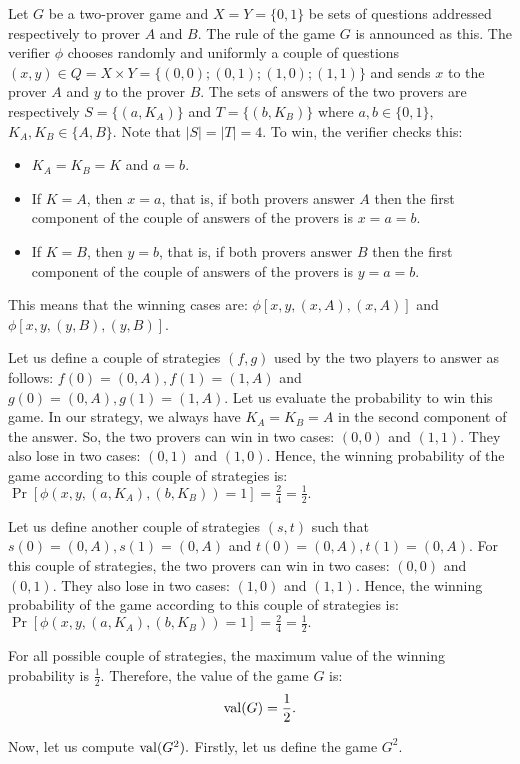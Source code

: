 Let $G$ be a two-prover game and  $X=Y=\{0,1\}$ be sets of questions addressed respectively to prover $A$ and $B$. The rule of the game $G$ is announced as this. The verifier $\phi$ chooses randomly and uniformly a couple of questions $(x,y) \in Q=X \times Y=\{(0,0);(0,1);(1,0);(1,1)\}$ and sends $x$ to the prover $A$ and $y$ to the prover $B$. The sets of answers of the  two provers are  respectively  $S=\{(a,K_A)\}$ and $T=\{(b,K_B)\}$ where $a,b \in \{0,1\}$,  $K_A,K_B \in \{A,B\}$. Note that $|S|=|T|=4.$ To win, the verifier checks this: \begin{itemize}
\item $K_A=K_B=K$ and $a=b$.
\item  If $K=A$, then $x=a$, that is,  if both provers answer $A$ then the  first component of the couple of  answers of the provers is $x=a=b$.
\item If $K=B$, then $y=b$, that is,  if both provers answer $B$ then the  first component of the couple of  answers of the provers is $y=a=b$.
\end{itemize}
This means that the winning cases are: $\phi[x,y, (x,A), (x,A)]$ and $\phi[x,y, (y,B), (y,B)]$.

Let us define a couple of strategies $(f,g)$ used by the two players to answer as follows:  $f(0)=(0,A), f(1)=(1,A)$ and  $g(0)=(0,A), g(1)=(1,A)$.
 Let us evaluate the probability to win this game. In our strategy, we always have $K_A=K_B=A$ in the second component of the answer. So, the two provers can win in two cases: $(0,0)$ and $(1,1)$. They also lose  in two cases: $(0,1)$ and $(1,0)$. Hence, the winning probability of the game according to this couple of strategies is: $\Pr [\phi(x,y, (a,K_A), (b,K_B))=1]=\frac{2}{4}=\frac{1}{2}.$
 
 Let us define another couple of strategies $(s,t)$ such that $s(0)=(0,A), s(1)=(0,A)$ and  $t(0)=(0,A), t(1)=(0,A)$. For this couple of strategies, the two provers can win in two cases: $(0,0)$ and $(0,1)$. They also lose  in two cases: $(1,0)$ and $(1,1)$. Hence, the winning probability of the game according to this couple of strategies is: $\Pr [\phi(x,y, (a,K_A), (b,K_B))=1]=\frac{2}{4}=\frac{1}{2}.$

For all possible couple of strategies, the maximum value of the winning probability is $\frac{1}{2}$. Therefore, the value of the game $G$  is: $$\mathrm{val} (G)= \frac{1}{2}.$$
 
Now, let us compute $\mathrm{val} (G^2).$ Firstly, let us define the game $G^2.$

